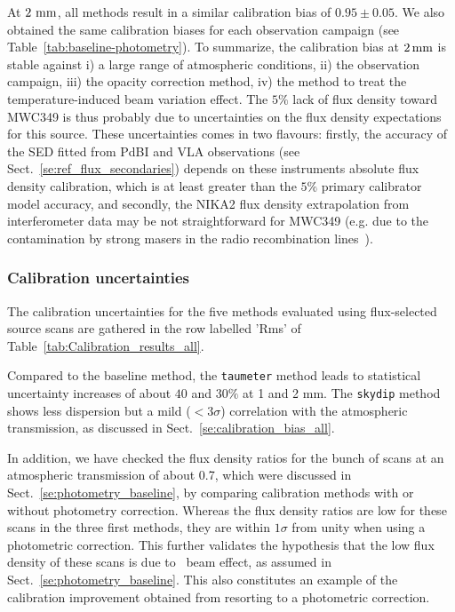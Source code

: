 At $2~\rm{mm}$, all methods result in a similar calibration bias
of $0.95 \pm 0.05$. We also obtained the same calibration
biases for each observation campaign (see
Table~\ref{tab:baseline-photometry}). To summarize, the
calibration bias at $2\, \rm{mm}$ is stable against i) a large range of
atmospheric conditions, ii) the observation campaign, iii) the
opacity correction method, iv) the method to treat the
temperature-induced beam variation effect.
The $5\%$ lack of flux density toward MWC349 is thus probably due to
uncertainties on the flux density expectations for this source.
These uncertainties comes in two flavours:
firstly, the accuracy of the SED fitted from PdBI and VLA observations
(see Sect.~\ref{se:ref_flux_secondaries})
depends on these instruments absolute flux density calibration, which
is at least greater than the $5\%$ primary calibrator model accuracy, 
and secondly, the NIKA2 flux density extrapolation from
interferometer data may be not straightforward for MWC349 (e.g. due to
the contamination by strong masers in the radio recombination
lines~\citep{masingRRL}).

\subsubsection{Calibration uncertainties}

The calibration uncertainties for the five methods evaluated using
flux-selected source scans are gathered in the row labelled 'Rms'
of Table~\ref{tab:Calibration_results_all}.

Compared to the baseline method, the {\tt taumeter} method leads to 
statistical uncertainty increases of about $40$ and $30\%$ at 1 and 2
mm. The {\tt skydip} method shows less dispersion but a mild
($<3\sigma$) correlation with the atmospheric transmission, as
discussed in Sect.~\ref{se:calibration_bias_all}.

In addition, we have checked the flux density ratios for the bunch of
scans at an atmospheric transmission of about 0.7, which were
discussed in Sect.~\ref{se:photometry_baseline}, by comparing
calibration methods with or without photometry correction. Whereas the
flux density ratios are low for these scans in the three first
methods, they are within $1\sigma$ from unity when using a photometric
correction. This further validates the hypothesis that the low flux
density of these scans is due to \afternoon\ beam effect, as assumed in
Sect.~\ref{se:photometry_baseline}. This also constitutes an example
of the calibration improvement obtained from resorting to a
photometric correction.

